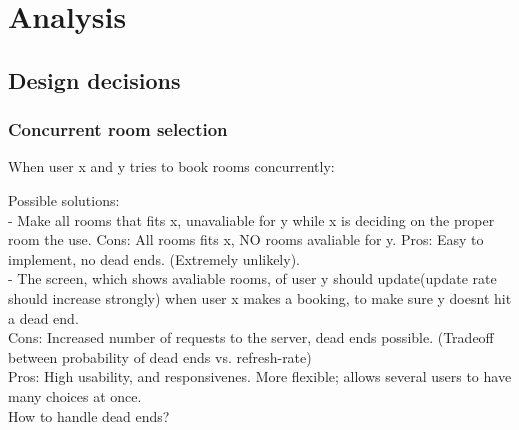 \chapter{Analysis}

\section{Design decisions}

\subsection{Concurrent room selection}
When user x and y tries to book rooms concurrently:

Possible solutions:\\

- Make all rooms that fits x, unavaliable for y while x is deciding on the proper room the use.
	Cons: All rooms fits x, NO rooms avaliable for y.
	Pros: Easy to implement, no dead ends. (Extremely unlikely).\\


- The screen, which shows avaliable rooms, of user y should update(update rate should increase strongly) when user x makes a booking, to make sure y doesnt hit a dead end.\\

Cons: Increased number of requests to the server, dead ends possible. (Tradeoff between probability of dead ends vs. refresh-rate)\\
Pros: High usability, and responsivenes. More flexible; allows several users to have many choices at once.\\

How to handle dead ends?